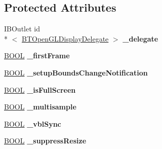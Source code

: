 \subsection*{Protected Attributes}
\begin{DoxyCompactItemize}
\item 
\hypertarget{interface_b_t_open_g_l_view_a42904f02a2cf402be6b198d29e08d274}{I\+B\+Outlet id\\*
$<$ \hyperlink{protocol_b_t_open_g_l_display_delegate-p}{B\+T\+Open\+G\+L\+Display\+Delegate} $>$ {\bfseries \+\_\+delegate}}\label{interface_b_t_open_g_l_view_a42904f02a2cf402be6b198d29e08d274}

\item 
\hypertarget{interface_b_t_open_g_l_view_af2f247312577e7648c0825431a2b5f5f}{\hyperlink{_ice_types_8h_a050c65e107f0c828f856a231f4b4e788}{B\+O\+O\+L} {\bfseries \+\_\+first\+Frame}}\label{interface_b_t_open_g_l_view_af2f247312577e7648c0825431a2b5f5f}

\item 
\hypertarget{interface_b_t_open_g_l_view_a0281627a9bd915008bc34a503d12e539}{\hyperlink{_ice_types_8h_a050c65e107f0c828f856a231f4b4e788}{B\+O\+O\+L} {\bfseries \+\_\+setup\+Bounds\+Change\+Notification}}\label{interface_b_t_open_g_l_view_a0281627a9bd915008bc34a503d12e539}

\item 
\hypertarget{interface_b_t_open_g_l_view_aa9c58f5306566e7a421729fecb6795a6}{\hyperlink{_ice_types_8h_a050c65e107f0c828f856a231f4b4e788}{B\+O\+O\+L} {\bfseries \+\_\+is\+Full\+Screen}}\label{interface_b_t_open_g_l_view_aa9c58f5306566e7a421729fecb6795a6}

\item 
\hypertarget{interface_b_t_open_g_l_view_a0b495cf6a6a944dee30ee6bb8b250f34}{\hyperlink{_ice_types_8h_a050c65e107f0c828f856a231f4b4e788}{B\+O\+O\+L} {\bfseries \+\_\+multisample}}\label{interface_b_t_open_g_l_view_a0b495cf6a6a944dee30ee6bb8b250f34}

\item 
\hypertarget{interface_b_t_open_g_l_view_afb36a13cbf59d7aff6b441f4fc1dc087}{\hyperlink{_ice_types_8h_a050c65e107f0c828f856a231f4b4e788}{B\+O\+O\+L} {\bfseries \+\_\+vbl\+Sync}}\label{interface_b_t_open_g_l_view_afb36a13cbf59d7aff6b441f4fc1dc087}

\item 
\hypertarget{interface_b_t_open_g_l_view_af7c7bad9d1895ab71af2d3b178181172}{\hyperlink{_ice_types_8h_a050c65e107f0c828f856a231f4b4e788}{B\+O\+O\+L} {\bfseries \+\_\+suppress\+Resize}}\label{interface_b_t_open_g_l_view_af7c7bad9d1895ab71af2d3b178181172}


\end{DoxyCompactItemize}
